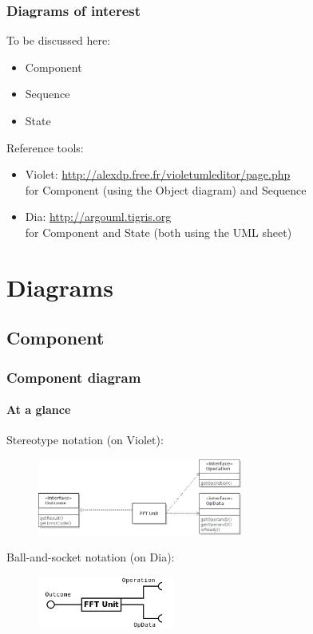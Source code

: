 \begin{frame}
\frametitle{Diagrams of interest}

\begin{block}{To be discussed here:}
\begin{itemize}
\item Component
\item Sequence
\item State
\end{itemize}
\end{block}

\begin{block}{Reference tools:}
\begin{itemize}
\item Violet: \url{http://alexdp.free.fr/violetumleditor/page.php}
\\ for Component (using the Object diagram) and Sequence
\item Dia: \url{http://argouml.tigris.org}
\\ for Component and State (both using the UML sheet)
\end{itemize}
\end{block}

\end{frame}

\section{Diagrams}

\subsection{Component}

\begin{frame}
\frametitle{Component diagram}
\framesubtitle{At a glance}

Stereotype notation (on Violet):
\begin{figure}
\includegraphics[width=0.6\textwidth]{lecture02/img/stereotype_components.png}
\end{figure}
Ball-and-socket notation (on Dia):
\begin{figure}
\includegraphics[width=0.4\textwidth]{lecture02/img/ballsocket_components.png}
\end{figure}


\end{frame}

